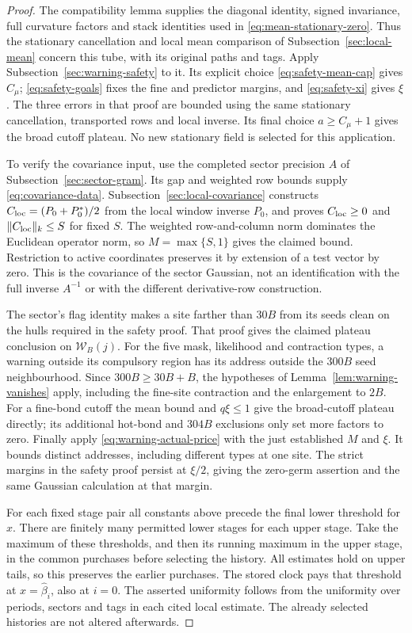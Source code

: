 \begin{proof}
The compatibility lemma supplies the diagonal identity, signed invariance,
full curvature factors and stack identities used in
\eqref{eq:mean-stationary-zero}. Thus the stationary cancellation and
local mean comparison of Subsection~\ref{sec:local-mean} concern this tube,
with its original paths and tags. Apply Subsection~\ref{sec:warning-safety}
to it. Its explicit choice \eqref{eq:safety-mean-cap} gives $C_\mu$;
\eqref{eq:safety-goals} fixes the fine and predictor margins, and
\eqref{eq:safety-xi} gives $\xi$. The three errors in that proof are
bounded using the same stationary cancellation, transported rows and
local inverse. Its final choice $a\ge C_\mu+1$ gives the broad cutoff
plateau. No new stationary field is selected for this application.

To verify the covariance input, use the completed sector precision
$A$ of Subsection~\ref{sec:sector-gram}. Its gap and weighted row bounds
supply \eqref{eq:covariance-data}. Subsection~\ref{sec:local-covariance}
constructs $C_{\rm loc}=(P_0+P_0^*)/2$ from the local window inverse
$P_0$, and proves $C_{\rm loc}\ge0$ and
$\|C_{\rm loc}\|_k\le S$ for fixed $S$. The weighted row-and-column
norm dominates the Euclidean operator norm, so $M=\max\{S,1\}$ gives
the claimed bound. Restriction to active coordinates preserves it by
extension of a test vector by zero. This is the covariance of the
sector Gaussian, not an identification with the full inverse $A^{-1}$
or with the different derivative-row construction.

The sector's flag identity makes a site farther than $30B$ from its
seeds clean on the hulls required in the safety proof. That proof gives
the claimed plateau conclusion on $\mathcal W_B(j)$. For the five mask, likelihood and contraction types, a warning outside
its compulsory region has its address outside the $300B$ seed
neighbourhood. Since $300B\ge30B+B$, the hypotheses of
Lemma~\ref{lem:warning-vanishes} apply, including the fine-site
contraction and the enlargement to $2B$. For a fine-bond cutoff the
mean bound and $q\xi\le1$ give the broad-cutoff plateau directly;
its additional hot-bond and $304B$ exclusions only set more factors
to zero. Finally apply
\eqref{eq:warning-actual-price} with the just established $M$ and $\xi$.
It bounds distinct addresses, including different types at one site.
The strict margins in the safety proof persist at $\xi/2$, giving the
zero-germ assertion and the same Gaussian calculation at that margin.

For each fixed stage pair all constants above precede the final lower
threshold for $x$. There are finitely many permitted lower stages for
each upper stage. Take the maximum of these thresholds, and then its
running maximum in the upper stage, in the common purchases before
selecting the history. All estimates hold on upper tails, so this
preserves the earlier purchases. The stored clock pays that threshold
at $x=\widehat\beta_i$, also at $i=0$. The asserted uniformity follows
from the uniformity over periods, sectors and tags in each cited local
estimate. The already selected histories are not altered afterwards.
\end{proof}

